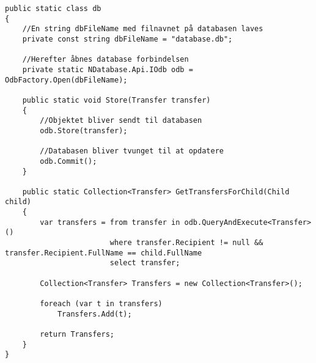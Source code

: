 \begin{lstlisting}[caption={Statisk klasse, der forbinder til objekt databasen NDatabase},label={lst:db}]
public static class db
{
	//En string dbFileName med filnavnet på databasen laves
	private const string dbFileName = "database.db";
	
	//Herefter åbnes database forbindelsen
	private static NDatabase.Api.IOdb odb = OdbFactory.Open(dbFileName);

	public static void Store(Transfer transfer)
	{
		//Objektet bliver sendt til databasen
		odb.Store(transfer);
		
		//Databasen bliver tvunget til at opdatere
		odb.Commit();
	}
	
	public static Collection<Transfer> GetTransfersForChild(Child child)
	{
		var transfers = from transfer in odb.QueryAndExecute<Transfer>()
						where transfer.Recipient != null && transfer.Recipient.FullName == child.FullName
						select transfer;

		Collection<Transfer> Transfers = new Collection<Transfer>();

		foreach (var t in transfers)
			Transfers.Add(t);

		return Transfers;
	}
}
\end{lstlisting}

